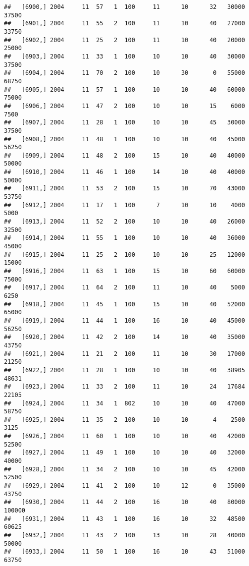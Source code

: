 \documentclass{article}\usepackage[]{graphicx}\usepackage[]{color}
\makeatletter
\newenvironment{kframe}{%
 \def\at@end@of@kframe{}%
 \ifinner\ifhmode%
  \def\at@end@of@kframe{\end{minipage}}%
  \begin{minipage}{\columnwidth}%
 \fi\fi%
 \def\FrameCommand##1{\hskip\@totalleftmargin \hskip-\fboxsep
 \colorbox{shadecolor}{##1}\hskip-\fboxsep
     \hskip-\linewidth \hskip-\@totalleftmargin \hskip\columnwidth}%
 \MakeFramed {\advance\hsize-\width
   \@totalleftmargin\z@ \linewidth\hsize
   \@setminipage}}%
 {\par\unskip\endMakeFramed%
 \at@end@of@kframe}
\newenvironment{knitrout}{}{} %
\makeatother
\begin{document}
\begin{knitrout}
\begin{kframe}
\begin{verbatim}
##   [6900,] 2004     11  57   1  100     11      10      32   30000   37500
##   [6901,] 2004     11  55   2  100     11      10      40   27000   33750
##   [6902,] 2004     11  25   2  100     11      10      40   20000   25000
##   [6903,] 2004     11  33   1  100     10      10      40   30000   37500
##   [6904,] 2004     11  70   2  100     10      30       0   55000   68750
##   [6905,] 2004     11  57   1  100     10      10      40   60000   75000
##   [6906,] 2004     11  47   2  100     10      10      15    6000    7500
##   [6907,] 2004     11  28   1  100     10      10      45   30000   37500
##   [6908,] 2004     11  48   1  100     10      10      40   45000   56250
##   [6909,] 2004     11  48   2  100     15      10      40   40000   50000
##   [6910,] 2004     11  46   1  100     14      10      40   40000   50000
##   [6911,] 2004     11  53   2  100     15      10      70   43000   53750
##   [6912,] 2004     11  17   1  100      7      10      10    4000    5000
##   [6913,] 2004     11  52   2  100     10      10      40   26000   32500
##   [6914,] 2004     11  55   1  100     10      10      40   36000   45000
##   [6915,] 2004     11  25   2  100     10      10      25   12000   15000
##   [6916,] 2004     11  63   1  100     15      10      60   60000   75000
##   [6917,] 2004     11  64   2  100     11      10      40    5000    6250
##   [6918,] 2004     11  45   1  100     15      10      40   52000   65000
##   [6919,] 2004     11  44   1  100     16      10      40   45000   56250
##   [6920,] 2004     11  42   2  100     14      10      40   35000   43750
##   [6921,] 2004     11  21   2  100     11      10      30   17000   21250
##   [6922,] 2004     11  28   1  100     10      10      40   38905   48631
##   [6923,] 2004     11  33   2  100     11      10      24   17684   22105
##   [6924,] 2004     11  34   1  802     10      10      40   47000   58750
##   [6925,] 2004     11  35   2  100     10      10       4    2500    3125
##   [6926,] 2004     11  60   1  100     10      10      40   42000   52500
##   [6927,] 2004     11  49   1  100     10      10      40   32000   40000
##   [6928,] 2004     11  34   2  100     10      10      45   42000   52500
##   [6929,] 2004     11  41   2  100     10      12       0   35000   43750
##   [6930,] 2004     11  44   2  100     16      10      40   80000  100000
##   [6931,] 2004     11  43   1  100     16      10      32   48500   60625
##   [6932,] 2004     11  43   2  100     13      10      28   40000   50000
##   [6933,] 2004     11  50   1  100     16      10      43   51000   63750

\end{verbatim}
\end{kframe}
\end{knitrout}
\end{document}
